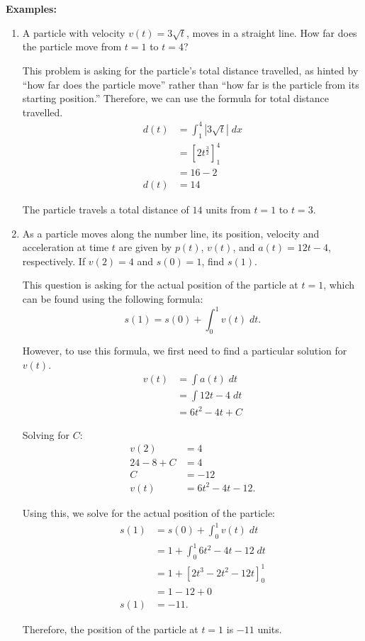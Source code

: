 \noindent \textbf{Examples:}
\begin{enumerate}
    \item A particle with velocity $v(t) = 3\sqrt{t}$, moves in a straight line. How far does the particle move from $t = 1$ to $t = 4$?

	This problem is asking for the particle's total distance travelled, as hinted by ``how far does the particle move'' rather than ``how far is the particle from its starting position.'' Therefore, we can use the formula for total distance travelled.
    \begin{align*}
        d(t) &= \int_1^4 |3\sqrt{t}| \; dx \\[5pt]
        &= \left[ 2 t^{\frac{3}{2}} \right]_1^4 \\
        &= 16 - 2 \\
        d(t) &= 14
    \end{align*}

    The particle travels a total distance of $14$ units from $t = 1$ to $t = 3$.

    \item As a particle moves along the number line, its position, velocity and acceleration at time $t$ are given by $p(t)$, $v(t)$, and $a(t) = 12t - 4$, respectively. If $v(2) = 4$ and $s(0) = 1$, find $s(1)$.

    This question is asking for the actual position of the particle at $t = 1$, which can be found using the following formula:
    \[ s(1) = s(0) + \int_0^1 v(t) \; dt. \]

    However, to use this formula, we first need to find a particular solution for $v(t)$.
    \begin{align*}
        v(t) &= \int a(t) \; dt \\[5pt]
        &= \int 12t - 4 \; dt \\
        &= 6t^2 - 4t + C
    \end{align*}

    Solving for $C$:
    \begin{align*}
        v(2) &= 4 \\
        24 - 8 + C &= 4 \\
        C &= -12 \\
        v(t) &= 6t^2 - 4t - 12.
    \end{align*}

    Using this, we solve for the actual position of the particle:
    \begin{align*}
        s(1) &= s(0) + \int_0^1 v(t) \; dt \\[5pt]
        &= 1 + \int_0^1 6t^2 - 4t - 12 \; dt \\
        &= 1 + \left[ 2t^3 - 2t^2 - 12t \right]_0^1 \\
        &= 1 - 12 + 0 \\
        s(1) &= -11.
    \end{align*}

    Therefore, the position of the particle at $t = 1$ is $-11$ units.
\end{enumerate}

